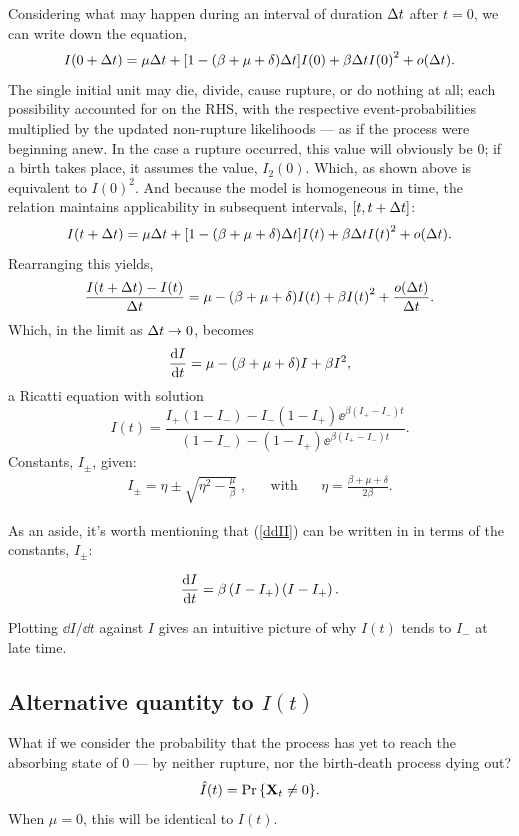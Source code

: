 Considering what may happen during an interval of duration $\Delta t$ after $t=0$, we can write down the equation,
$$I(0+\Delta t) = \mu \Delta t + [1 - (\beta + \mu + \delta)\Delta t] I(0) + \beta\Delta t {I(0)}^2 + o(\Delta t). $$
The single initial unit may die, divide, cause rupture, or do nothing at all; each possibility accounted for on the RHS, with the respective event-probabilities multiplied by the updated non-rupture likelihoods --- as if the process were beginning anew. In the case a rupture occurred, this value will obviously be 0; if a birth takes place, it assumes the value, $I_2(0)$. Which, as shown above is equivalent to ${I(0)}^2$. And because the model is homogeneous in time, the relation maintains applicability in subsequent intervals, $[t, t+\Delta t]$:
$$I(t+\Delta t) = \mu \Delta t + [1 - (\beta + \mu + \delta)\Delta t] I(t) + \beta\Delta t {I(t)}^2 + o(\Delta t). $$
Rearranging this yields, 
$$\frac{I(t+\Delta t) -I(t)}{\Delta t} = \mu - (\beta + \mu + \delta) I(t) + \beta {I(t)}^2 + \frac{o(\Delta t)}{\Delta t}.$$
Which, in the limit as $\Delta t\to 0$, becomes
\begin{equation}
\label{ddII}
\displaystyle\frac{{\rm d} I}{{\rm d} t} = \mu - (\beta + \mu + \delta) I + \beta {I}^2,
\end{equation}
a Ricatti equation with solution
\begin{equation}
\label{formI}
I(t) = \frac{I_+(1-I_-) - I_-(1-I_+) \ee^{\beta(I_+ - I_-)t}}{(1-I_-) - (1-I_+) \ee^{\beta(I_+ - I_-)t}}.
\end{equation}
Constants, $I_{\pm}$, given:
\begin{align*}
I_{\pm} = \eta \pm \sqrt{\eta^2 - \frac{\mu}{\beta}}\;, \hspace{20pt} \text{with}\hspace{20pt} \eta = \frac{\beta + \mu + \delta}{2\beta}.
\end{align*}

As an aside, it's worth mentioning that (\ref{ddII}) can be written in in terms of the constants, $I_{\pm}$:

\begin{equation}
\label{ddIIfact}
\displaystyle\frac{{\rm d} I}{{\rm d} t} =\beta\left( I-I_+\right)\left( I-I_+\right).
\end{equation}



\noindent
Plotting $\dd I/\dd t$ against $I$ gives an intuitive picture of why $I(t)$ tends to $I_-$ at late time. 


\subsection{Alternative quantity to $I(t)$}
What if we consider the probability that the process has yet to reach the absorbing state of 0 --- by neither rupture, nor the birth-death process dying out? 
$$\hat I(t) = {\text{Pr}\left\{{{\bf X}_t} \neq 0\right\}}.$$
When $\mu = 0$, this will be identical to $I(t)$.

